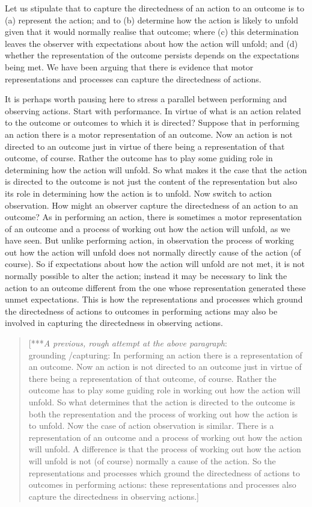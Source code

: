 \documentclass[12pt,\papersize]{extarticle}
\begin{document}
Let us stipulate that to capture the directedness of an action to an outcome is to (a) represent the action; and to (b) determine how the action is likely to unfold given that it would normally realise that outcome; where (c) this determination leaves the observer with expectations about how the action will unfold; and (d) whether the representation of the outcome persists depends on the expectations being met.  We have been arguing that there is evidence that motor representations and processes can capture the directedness of actions. 

It is perhaps worth pausing here to stress a parallel between performing and observing actions. Start with performance.  In virtue of what is an action related to the outcome or outcomes to which it is directed?  Suppose that in performing an action there is a motor representation of an outcome.  Now an action is not directed to an outcome just in virtue of there being a representation of that outcome, of course.  Rather the outcome has to play some guiding role in determining how the action will unfold.  So what makes it the case that the action is directed to the outcome is not just the content of the representation but also its role in determining how the action is to unfold.  Now switch to action observation.  How might an observer capture the directedness of an action to an outcome?  As in performing an action, there is sometimes a motor representation of an outcome and a process of working out how the action will unfold, as we have seen.  But unlike performing action, in observation the process of working out how the action will unfold does not normally directly cause of the action (of course).  So if expectations about how the action will unfold are not met, it is not normally possible to alter the action; instead it may be necessary to link the action to an outcome different from the one whose representation generated these unmet expectations.  This is how the representations and processes which ground the directedness of actions to outcomes in performing actions may also be involved in capturing the directedness in observing actions.
%
\begin{quote}
[***\textit{A previous, rough attempt at the above paragraph}:  \\
grounding /capturing: In performing an action there is a representation of an outcome.  Now an action is not directed to an outcome just in virtue of there being a representation of that outcome, of course.  Rather the outcome has to play some guiding role in working out how the action will unfold.  So what determines that the action is directed to the outcome is both the representation and the process of working out how the action is to unfold.  Now the case of action observation is similar.  There is a representation of an outcome and a process of working out how the action will unfold.  A difference is that the process of working out how the action will unfold is not (of course) normally a cause of the action.  So the representations and processes which ground the directedness of actions to outcomes in performing actions: these representations and processes also capture the directedness in observing actions.]
\end{quote}
\end{document}
